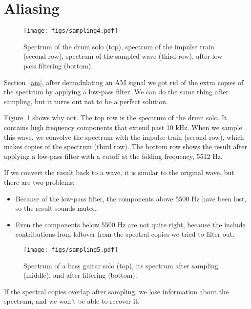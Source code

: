 \documentclass[12pt]{book} \usepackage[width=5.5in,height=8.5in, hmarginratio=3:2,vmarginratio=1:1]{geometry}
\begin{document}
\section{Aliasing} 

\begin{figure} 

\centerline{\texttt{[image: figs/sampling4.pdf]}} \caption{Spectrum of the drum solo (top), spectrum of the impulse train (second row), spectrum of the sampled wave (third row), after low-pass filtering (bottom).} \label{fig.sampling4} \end{figure} 

Section~\ref{am}, after demodulating an AM signal we got rid of the extra copies of the spectrum by applying a low-pass filter. We can do the same thing after sampling, but it turns out not to be a perfect solution. 

Figure~\ref{fig.sampling4} shows why not. The top row is the spectrum of the drum solo. It contains high frequency components that extend past 10 kHz. When we sample this wave, we convolve the spectrum with the impulse train (second row), which makes copies of the spectrum (third row). The bottom row shows the result after applying a low-pass filter with a cutoff at the folding frequency, 5512 Hz. 

If we convert the result back to a wave, it is similar to the original wave, but there are two problems: 

\begin{itemize} 

\item Because of the low-pass filter, the components above 5500 Hz have been lost, so the result sounds muted. 

\item Even the components below 5500 Hz are not quite right, because the include contributions from leftover from the spectral copies we tried to filter out. 

\end{itemize} 

\begin{figure} 

\centerline{\texttt{[image: figs/sampling5.pdf]}} \caption{Spectrum of a bass guitar solo (top), its spectrum after sampling (middle), and after filtering (bottom).} \label{fig.sampling5} \end{figure} 

If the spectral copies overlap after sampling, we lose information about the spectrum, and we won't be able to recover it. 
\end{document}
